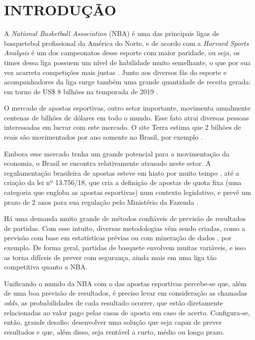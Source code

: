 \documentclass[brazilian]{ifsc-tcc}
\begin{document}
 

\chapter{INTRODUÇÃO}

A \textit{National Basketball Association} (NBA) é uma das principais ligas de basquetebol profissional da América do Norte, e de acordo com a \textit{Harvard Sports Analysis} é um dos campeonatos desse esporte com maior paridade, ou seja, os times dessa liga possuem um nível de habilidade muito semelhante, o que por sua vez acarreta competições mais justas \cite{paridade-basquete-harvard}. Junto aos diversos fãs do esporte e acompanhadores da liga surge também uma grande quantidade de receita gerada: em torno de US\$ 8 bilhões na temporada de 2019 \cite{nba-revenue-2019}.

O mercado de apostas esportivas, outro setor importante, movimenta anualmente centenas de bilhões de dólares em todo o mundo. Esse fato atrai diversas pessoas interessadas em lucrar com este mercado. O site Terra estima que 2 bilhões de reais são movimentados por ano somente no Brasil, por exemplo \cite{dados-dinheiro-terra}. 

Embora esse mercado tenha um grande potencial para a movimentação da economia, o Brasil se encontra relativamente atrasado neste setor. A regulamentação brasileira de apostas esteve em hiato por muito tempo \cite{tcc-regulamentacao-apostas}, até a criação da lei nº 13.756/18, que cria a definição de apostas de quota fixa (uma categoria que engloba as apostas esportivas) num contexto legislativo, e prevê um prazo de 2 anos para sua regulação pelo Ministério da Fazenda \cite{lei1375618}.

Há uma demanda muito grande de métodos confiáveis de previsão de resultados de partidas. Com esse intuito, diversas metodologias vêm sendo criadas, como a previsão com base em estatísticas prévias \cite{modelagem-estatistica-futebol} ou com mineração de dados \cite{Predicao-de-playoff-com-mineracao-de-dados}, por exemplo. De forma geral, partidas de basquete envolvem muitas variáveis, e isso as torna difíceis de prever com segurança, ainda mais em uma liga tão competitiva quanto a NBA.

Unificando o mundo da NBA com o das apostas esportivas percebe-se que, além de uma boa previsão de resultados, é preciso levar em consideração as chamadas \textit{odds}, as probabilidades de cada resultado ocorrer, que estão diretamente relacionadas ao valor pago pelas casas de aposta em caso de acerto. Configura-se, então, grande desafio: desenvolver uma solução que seja capaz de prever resultados e que, além disso, seja rentável a curto, médio ou longo prazo. 
\end{document}
